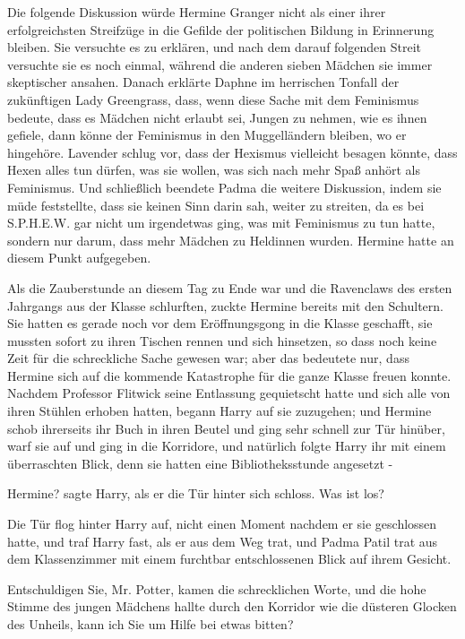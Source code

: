 Die folgende Diskussion würde Hermine Granger nicht als einer ihrer
erfolgreichsten Streifzüge in die Gefilde der politischen Bildung in Erinnerung
bleiben. Sie versuchte es zu erklären, und nach dem darauf folgenden Streit
versuchte sie es noch einmal, während die anderen sieben Mädchen sie immer
skeptischer ansahen. Danach erklärte Daphne im herrischen Tonfall der
zukünftigen Lady Greengrass, dass, wenn diese Sache mit dem Feminismus bedeute,
dass es Mädchen nicht erlaubt sei, Jungen zu nehmen, wie es ihnen gefiele, dann
könne der Feminismus in den Muggelländern bleiben, wo er hingehöre. Lavender
schlug vor, dass der Hexismus vielleicht besagen könnte, dass Hexen alles tun
dürfen, was sie wollen, was sich nach mehr Spaß anhört als Feminismus. Und
schließlich beendete Padma die weitere Diskussion, indem sie müde feststellte,
dass sie keinen Sinn darin sah, weiter zu streiten, da es bei S.P.H.E.W. gar
nicht um irgendetwas ging, was mit Feminismus zu tun hatte, sondern nur darum,
dass mehr Mädchen zu Heldinnen wurden. Hermine hatte an diesem Punkt aufgegeben.

Als die Zauberstunde an diesem Tag zu Ende war und die Ravenclaws des ersten
Jahrgangs aus der Klasse schlurften, zuckte Hermine bereits mit den Schultern.
Sie hatten es gerade noch vor dem Eröffnungsgong in die Klasse geschafft, sie
mussten sofort zu ihren Tischen rennen und sich hinsetzen, so dass noch keine
Zeit für die schreckliche Sache gewesen war; aber das bedeutete nur, dass
Hermine sich auf die kommende Katastrophe für die ganze Klasse freuen konnte.
Nachdem Professor Flitwick seine Entlassung gequietscht hatte und sich alle von
ihren Stühlen erhoben hatten, begann Harry auf sie zuzugehen; und Hermine schob
ihrerseits ihr Buch in ihren Beutel und ging sehr schnell zur Tür hinüber, warf
sie auf und ging in die Korridore, und natürlich folgte Harry ihr mit einem
überraschten Blick, denn sie hatten eine Bibliotheksstunde angesetzt -

\glqq{}Hermine?\grqq{} sagte Harry, als er die Tür hinter sich schloss. \glqq{}Was
ist los?\grqq{}

Die Tür flog hinter Harry auf, nicht einen Moment nachdem er sie geschlossen
hatte, und traf Harry fast, als er aus dem Weg trat, und Padma Patil trat aus
dem Klassenzimmer mit einem furchtbar entschlossenen Blick auf ihrem Gesicht.

\glqq{}Entschuldigen Sie, Mr. Potter\grqq{}, kamen die schrecklichen Worte, und
die hohe Stimme des jungen Mädchens hallte durch den Korridor wie die düsteren
Glocken des Unheils, \glqq{}kann ich Sie um Hilfe bei etwas bitten?\grqq{}

